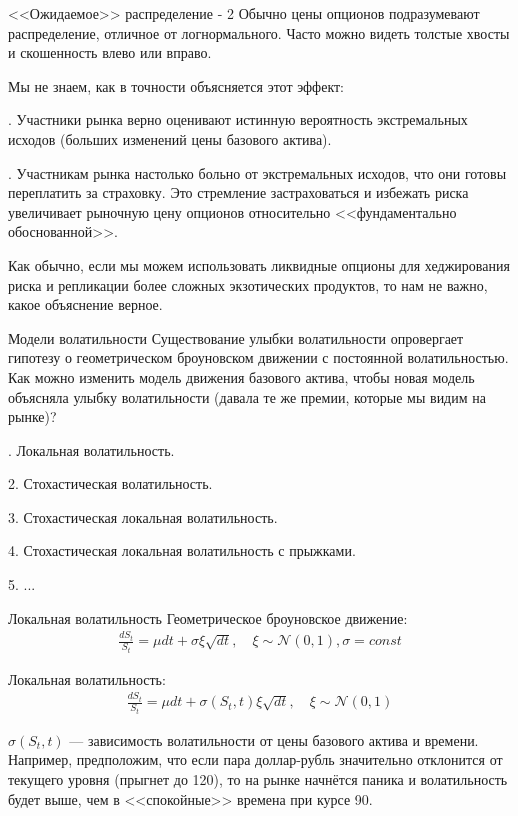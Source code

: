 \documentclass{beamer}
\begin{document}
\begin{frame}{<<Ожидаемое>> распределение - 2}
\justify
Обычно цены опционов подразумевают распределение, отличное от логнормального. Часто можно видеть толстые хвосты и скошенность влево или вправо.

\justify
Мы не знаем, как в точности объясняется этот эффект:

. Участники рынка верно оценивают истинную вероятность экстремальных исходов (больших изменений цены базового актива).

. Участникам рынка настолько больно от экстремальных исходов, что они готовы переплатить за страховку. Это стремление застраховаться и избежать риска увеличивает рыночную цену опционов относительно <<фундаментально обоснованной>>.

\justify
Как обычно, если мы можем использовать ликвидные опционы для хеджирования риска и репликации более сложных экзотических продуктов, то нам не важно, какое объяснение верное.
\end{frame}



\begin{frame}{Модели волатильности}
\justify
Существование улыбки волатильности опровергает гипотезу о геометрическом броуновском движении с постоянной волатильностью. Как можно изменить модель движения базового актива, чтобы новая модель объясняла улыбку волатильности (давала те же премии, которые мы видим на рынке)?

. Локальная волатильность.

2. Стохастическая волатильность.

3. Стохастическая локальная волатильность.

4. Стохастическая локальная волатильность с прыжками.

5. ...
\end{frame}



\begin{frame}{Локальная волатильность}
\justify
Геометрическое броуновское движение:
\begin{align*}
\frac{dS_t}{S_t} = \mu dt + \sigma\xi\sqrt{dt}, \quad \xi \sim \mathcal{N}(0, 1), \sigma = const
\end{align*}

\justify
Локальная волатильность:
\begin{align*}
\frac{dS_t}{S_t} = \mu dt + \sigma(S_t, t)\xi\sqrt{dt}, \quad \xi \sim \mathcal{N}(0, 1)
\end{align*}

\justify
$\sigma(S_t, t)$ --- зависимость волатильности от цены базового актива и времени. Например, предположим, что если пара доллар-рубль значительно отклонится от текущего уровня (прыгнет до 120), то на рынке начнётся паника и волатильность будет выше, чем в <<спокойные>> времена при курсе 90.
\end{frame}
\end{document}
